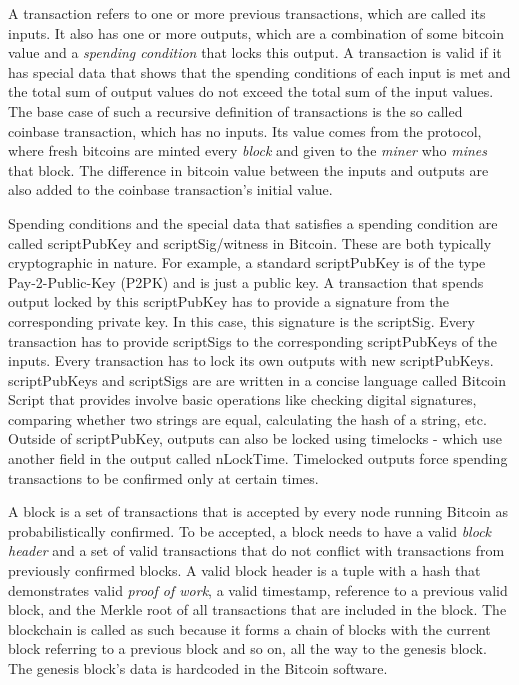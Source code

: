 A  transaction refers to one or more previous transactions, which are called its inputs. It also has one or more outputs, which are a combination of some bitcoin value and a \textit{spending condition} that locks this output. A transaction is valid if it has special data that shows that the spending conditions of each input is met and the total sum of output values do not exceed the total sum of the input values. The base case of such a recursive definition of transactions is the so called coinbase transaction, which has no inputs. Its value comes from the protocol, where fresh bitcoins are minted every \textit{block} and given to the \textit{miner} who \textit{mines} that block. The difference in bitcoin value between the inputs and outputs are also added to the coinbase transaction's initial value.

Spending conditions and the special data that satisfies a spending condition are called scriptPubKey and scriptSig/witness in Bitcoin. These are both typically cryptographic in nature. For example, a standard scriptPubKey is of the type Pay-2-Public-Key (P2PK) and is just a public key. A transaction that spends output locked by this scriptPubKey has to provide a signature from the corresponding private key. In this case, this signature is the scriptSig. Every transaction has to provide scriptSigs to the corresponding scriptPubKeys of the inputs. Every transaction has to lock its own outputs with new scriptPubKeys. scriptPubKeys and scriptSigs are are written in a concise language called Bitcoin Script that provides involve basic operations like checking digital signatures, comparing whether two strings are equal, calculating the hash of a string, etc. Outside of scriptPubKey, outputs can also be locked using timelocks - which use another field in the output called nLockTime. Timelocked outputs force spending transactions to be confirmed only at certain times. 

A block is a set of transactions that is accepted by every node running Bitcoin as probabilistically confirmed. To be accepted, a block needs to have a valid \textit{block header} and a set of valid transactions that do not conflict with transactions from previously confirmed blocks. A valid block header is a tuple with a hash that demonstrates valid \textit{proof of work}, a valid timestamp, reference to a previous valid block, and the Merkle root of all transactions that are included in the block. The blockchain is called as such because it forms a chain of blocks with the current block referring to a previous block and so on, all the way to the genesis block. The genesis block's data is hardcoded in the Bitcoin software. 


